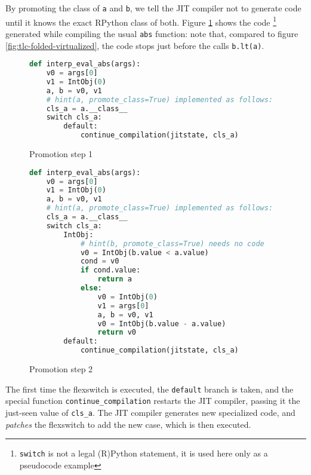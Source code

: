 By promoting the class of \lstinline{a} and \lstinline{b}, we tell the JIT
compiler not to generate code until it knows the exact RPython class of both.
Figure \ref{fig:tlc-abs-promotion-1} shows the
code \footnote{\lstinline{switch} is not a legal (R)Python statement, it is
  used here only as a pseudocode example} generated while compiling the usual
\lstinline{abs} function: note that, compared to figure
\ref{fig:tlc-folded-virtualized}, the code stops just before the calls
\lstinline{b.lt(a)}.

\begin{figure}[h]
\begin{center}
\begin{lstlisting}[language=Python]
def interp_eval_abs(args):
    v0 = args[0]
    v1 = IntObj(0)
    a, b = v0, v1
    # hint(a, promote_class=True) implemented as follows:
    cls_a = a.__class__
    switch cls_a:
        default: 
            continue_compilation(jitstate, cls_a)
\end{lstlisting}
\caption{Promotion step 1}
\label{fig:tlc-abs-promotion-1}
\end{center}
\end{figure}

\begin{figure}[h]
\begin{center}
\begin{lstlisting}[language=Python]
def interp_eval_abs(args):
    v0 = args[0]
    v1 = IntObj(0)
    a, b = v0, v1
    # hint(a, promote_class=True) implemented as follows:
    cls_a = a.__class__
    switch cls_a:
        IntObj:
            # hint(b, promote_class=True) needs no code
            v0 = IntObj(b.value < a.value)
            cond = v0
            if cond.value:
                return a
            else:
                v0 = IntObj(0)
                v1 = args[0]
                a, b = v0, v1
                v0 = IntObj(b.value - a.value)
                return v0
        default: 
            continue_compilation(jitstate, cls_a)
\end{lstlisting}
\caption{Promotion step 2}
\label{fig:tlc-abs-promotion-2}
\end{center}
\end{figure}

The first time the flexswitch is executed, the \lstinline{default} branch is
taken, and the special function \lstinline{continue_compilation} restarts the
JIT compiler, passing it the just-seen value of \lstinline{cls_a}.  The JIT
compiler generates new specialized code, and \emph{patches} the flexswitch to
add the new case, which is then executed.

